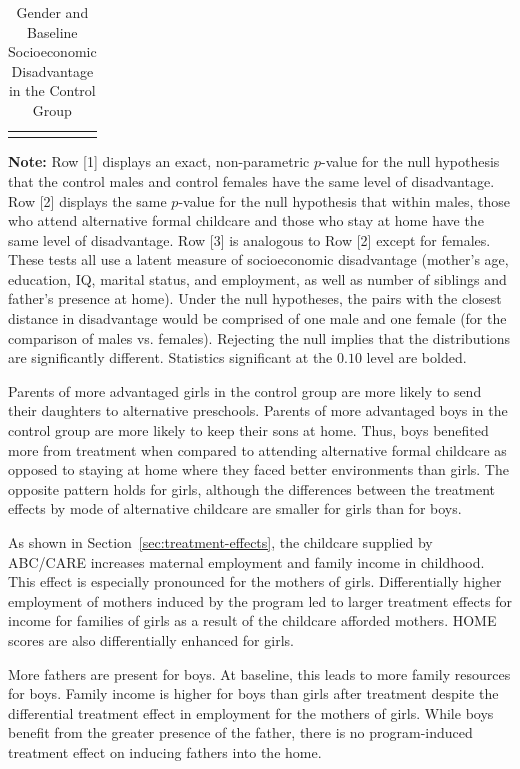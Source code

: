 \begin{table}[!htpb]
\begin{threeparttable}
\caption{Gender and Baseline Socioeconomic Disadvantage in the Control Group} \label{table:disadtests}
\centering
\begin{tabularx}{16.5cm}{XcX}
&  &
\end{tabularx}
\begin{tablenotes}
\footnotesize
\item \textbf{Note:} Row [1] displays an exact, non-parametric $p$-value for the null hypothesis that the control males and control females have the same level of disadvantage. Row [2] displays the same $p$-value for the null  hypothesis that within males, those who attend alternative formal childcare and those who stay at home have the same level of disadvantage. Row [3] is analogous to Row [2] except for females. These tests all use a latent measure of socioeconomic disadvantage (mother's age, education, IQ, marital status, and employment, as well as number of siblings and father's presence at home). Under the null hypotheses, the pairs with the closest distance in disadvantage would be comprised of one male and one female (for the comparison of males vs. females). Rejecting the null implies that the distributions are significantly different. Statistics significant at the $0.10$ level are bolded.
\end{tablenotes}
\end{threeparttable}
\end{table}

Parents of more advantaged girls in the control group are more likely to send their daughters to alternative preschools. Parents of more advantaged boys in the control group are more likely to keep their sons at home. Thus, boys benefited more from treatment when compared to attending alternative formal childcare as opposed to staying at home where they faced better environments than girls. The opposite pattern holds for girls, although the differences between the treatment effects by mode of alternative childcare are smaller for girls than for boys. 

As shown in Section~\ref{sec:treatment-effects}, the childcare supplied by ABC/CARE increases maternal employment and family income in childhood. This effect is especially pronounced for the mothers of girls. Differentially higher employment of mothers induced by the program led to larger treatment effects for income for families of girls as a result of the childcare afforded mothers. HOME scores are also differentially enhanced for girls.

More fathers are present for boys. At baseline, this leads to more family resources for boys. Family income is higher for boys than girls after treatment despite the differential treatment effect in employment for the mothers of girls. While boys benefit from the greater presence of the father, there is no program-induced treatment effect on inducing fathers into the home.


